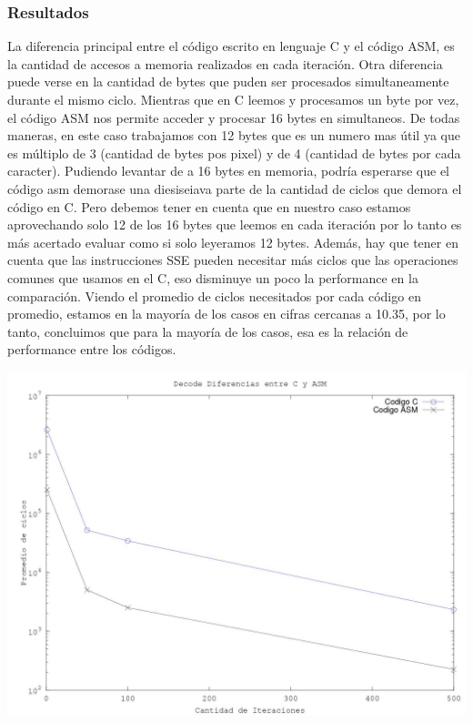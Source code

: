\subsubsection{Resultados}
La diferencia principal entre el c\'odigo escrito en lenguaje C y el c\'odigo ASM, es la cantidad de accesos a memoria realizados en cada iteraci\'on. Otra diferencia puede verse en la cantidad de bytes que puden ser procesados simultaneamente durante el mismo ciclo. Mientras que en C leemos y procesamos un byte por vez, el c\'odigo ASM nos permite acceder y procesar 16 bytes en simultaneos. De todas maneras, en este caso trabajamos con 12 bytes que es un numero mas \'util ya que es m\'ultiplo de 3 (cantidad de bytes pos pixel)  y de 4 (cantidad de bytes por cada caracter).
\newline
Pudiendo levantar de a 16 bytes en memoria, podr\'ia esperarse que el c\'odigo asm demorase una diesiseiava parte de la cantidad de ciclos que demora el c\'odigo en C. Pero debemos tener en cuenta que en nuestro caso estamos aprovechando solo 12 de los 16 bytes que leemos en cada iteraci\'on por lo tanto es más acertado evaluar como si solo leyeramos 12 bytes. Adem\'as, hay que tener en cuenta que las instrucciones SSE pueden necesitar más ciclos que las operaciones comunes que usamos en el C, eso disminuye un poco la performance en la comparación. Viendo el promedio de ciclos necesitados por cada c\'odigo en promedio, estamos en la mayor\'ia de los casos en cifras cercanas a 10.35, por lo tanto, concluimos que para la mayoría de los casos, esa es la relaci\'on de performance entre los códigos.
\newline

\includegraphics[scale=0.7]{imagenes/octave1.jpg}

